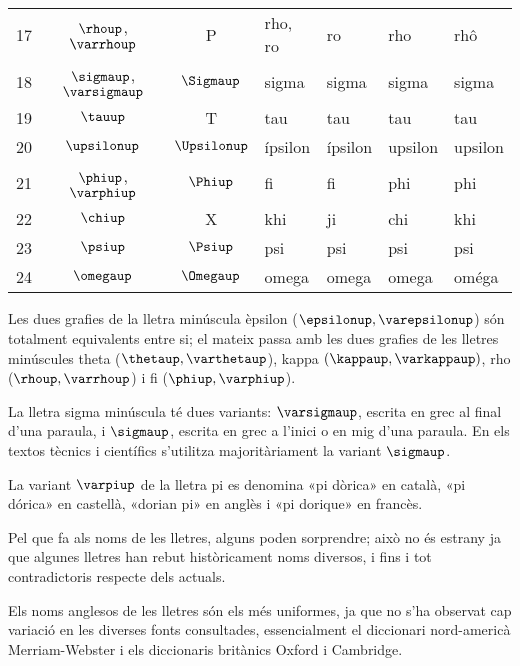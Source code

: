 \begin{center}
\begin{tabular}{cccllll}
   17 & $\rhoup$, $\varrhoup$ & P & rho, ro & ro &  rho & rhô\\
   18 & $\sigmaup$, $\varsigmaup$ & $\Sigmaup$ & sigma & sigma &  sigma &sigma\\
   19 & $\tauup$ & T & tau & tau & tau &tau\\
   20 & $\upsilonup$ & $\Upsilonup$ & ípsilon & ípsilon &  upsilon &upsilon\\
   21 & $\phiup$, $\varphiup$ & $\Phiup$ & fi & fi &  phi & phi\\
   22 & $\chiup$ & X & khi & ji &  chi & khi\\
   23 & $\psiup$ & $\Psiup$ & psi & psi &  psi & psi\\
   24 & $\omegaup$ & $\Omegaup$ & omega & omega &  omega & oméga\\
   \bottomrule[1pt]
   \end{tabular}
\end{center}
\pagebreak


Les dues grafies de la lletra minúscula èpsilon  ($\epsilonup,
\varepsilonup$) són totalment equivalents entre si; el mateix passa
amb les dues grafies de les lletres minúscules theta ($\thetaup,
\varthetaup$), kappa $(\kappaup, \varkappaup)$, rho ($\rhoup,\varrhoup$) i fi ($\phiup, \varphiup$).

La lletra sigma minúscula té dues variants: $\varsigmaup$, escrita en
grec al final d'una paraula, i $\sigmaup$, escrita en grec a l'inici o
en mig d'una paraula. En els textos tècnics i científics s'utilitza
majoritàriament la variant $\sigmaup$.

La variant $\varpiup$ de la lletra pi es denomina «pi dòrica» en
català, «pi dórica» en castellà, «dorian pi» en anglès i «pi dorique» en francès.

Pel que fa als noms de les lletres, alguns poden sorprendre; això no
és estrany ja que algunes lletres han rebut històricament noms
diversos, i fins i tot contradictoris respecte dels actuals.

Els noms anglesos de les lletres són els més uniformes, ja que no
s'ha observat cap variació en les diverses fonts consultades, essencialment el diccionari nord-americà Merriam-Webster i els diccionaris britànics Oxford i Cambridge.

